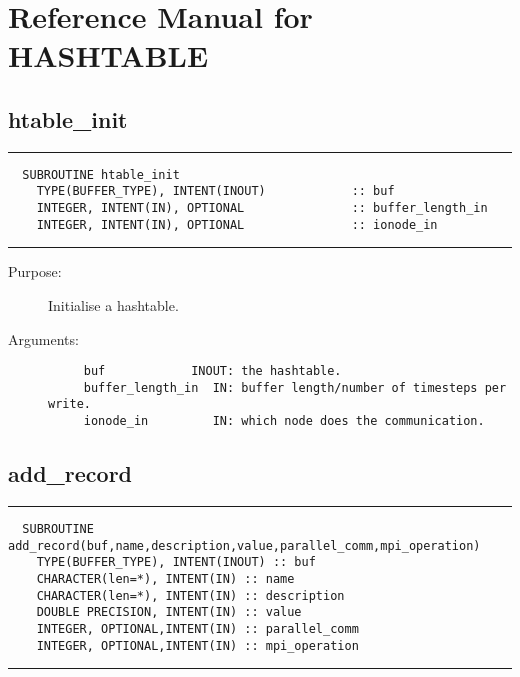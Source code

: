 \documentclass[a4paper]{article}
\begin{document}
\section{Reference Manual for HASHTABLE}






\subsection{htable\_init}

\par
\addvspace{\medskipamount}
\nopagebreak\hrule
\begin{verbatim}
  SUBROUTINE htable_init
    TYPE(BUFFER_TYPE), INTENT(INOUT)            :: buf
    INTEGER, INTENT(IN), OPTIONAL               :: buffer_length_in
    INTEGER, INTENT(IN), OPTIONAL               :: ionode_in
\end{verbatim}
\nopagebreak\hrule
\addvspace{\medskipamount}

\begin{description}
\item[Purpose:] \mbox{}

Initialise a hashtable.

\item[Arguments:] \mbox{}

\begin{verbatim}
     buf            INOUT: the hashtable.
     buffer_length_in  IN: buffer length/number of timesteps per write.
     ionode_in         IN: which node does the communication.

\end{verbatim}


\end{description}





\subsection{add\_record}

\par
\addvspace{\medskipamount}
\nopagebreak\hrule
\begin{verbatim}
  SUBROUTINE add_record(buf,name,description,value,parallel_comm,mpi_operation)
    TYPE(BUFFER_TYPE), INTENT(INOUT) :: buf
    CHARACTER(len=*), INTENT(IN) :: name
    CHARACTER(len=*), INTENT(IN) :: description
    DOUBLE PRECISION, INTENT(IN) :: value
    INTEGER, OPTIONAL,INTENT(IN) :: parallel_comm
    INTEGER, OPTIONAL,INTENT(IN) :: mpi_operation
\end{verbatim}
\nopagebreak\hrule
\addvspace{\medskipamount}
\end{document}
